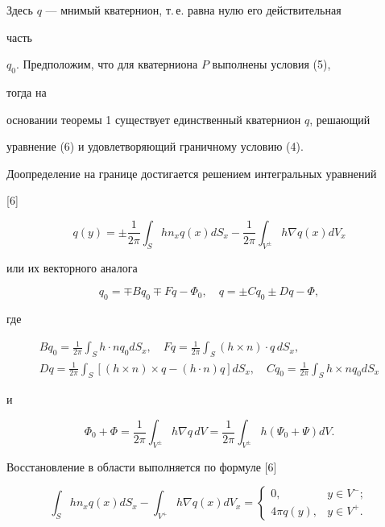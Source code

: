 Здесь $q$ --- мнимый кватернион, т.\,е. равна нулю его действительная 


часть  


$q_0$. Предположим, что для кватерниона $P$ выполнены условия (5), 


тогда на  


основании теоремы 1 существует единственный кватернион $q$, решающий 


уравнение (6) и удовлетворяющий граничному условию (4). 


 


Доопределение на границе достигается решением интегральных уравнений  


[6] 


$$


q(y)=\pm\frac{1}{2\pi}\int_S h n_x q(x)dS_x-\frac{1}{2\pi} 


\int_{V^\pm}h\nabla q(x)dV_x 


$$


или их векторного аналога 


\begin{equation} 


q_0=\mp B q_0\mp F q-\Phi_0,\quad 


q=\pm C q_0\pm D q-\Phi, 


\end{equation} 


где  


\begin{gather*} 


B q_0=\frac{1}{2\pi}\int_S h\cdot n q_0dS_x,\quad 


F q=\frac{1}{2\pi}\int_S (h\times n)\cdot q\,dS_x,\\ 


D q=\frac{1}{2\pi}\int_S[(h\times n)\times q-(h\cdot n)q]dS_x, 


\quad C q_0=\frac{1}{2\pi}\int_S h\times n q_0dS_x 


\end{gather*} 


и 


$$ 


\Phi_0+\Phi=\frac{1}{2\pi}\int_{V^\pm}h\nabla q\,dV= 


\frac{1}{2\pi}\int_{V^\pm}h(\Psi_0+\Psi)dV. 


$$ 


Восстановление в области выполняется по формуле [6] 


\begin{equation} 


\int_S h n_x q(x)dS_x-\int_{V^+}h\nabla q(x)dV_x= 


\begin{cases} 


0, & y\in V^-;\\ 


4\pi q(y), & y\in V^+. 


\end{cases} 


\end{equation} 


